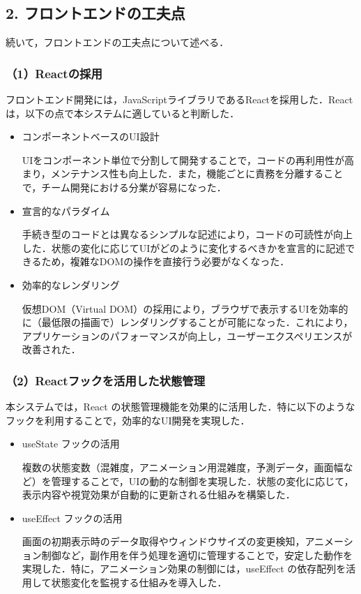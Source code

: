 \subsection*{2. フロントエンドの工夫点}

続いて，フロントエンドの工夫点について述べる．

\subsubsection*{（1）Reactの採用}
フロントエンド開発には，JavaScriptライブラリであるReactを採用した．Reactは，以下の点で本システムに適していると判断した．

\begin{itemize}
	\item コンポーネントベースのUI設計
	
	UIをコンポーネント単位で分割して開発することで，コードの再利用性が高まり，メンテナンス性も向上した．また，機能ごとに責務を分離することで，チーム開発における分業が容易になった．
	
	\item 宣言的なパラダイム
	
	手続き型のコードとは異なるシンプルな記述により，コードの可読性が向上した．状態の変化に応じてUIがどのように変化するべきかを宣言的に記述できるため，複雑なDOMの操作を直接行う必要がなくなった．
	
	\item 効率的なレンダリング
	
	仮想DOM（Virtual DOM）の採用により，ブラウザで表示するUIを効率的に（最低限の描画で）レンダリングすることが可能になった．これにより，アプリケーションのパフォーマンスが向上し，ユーザーエクスペリエンスが改善された．
\end{itemize}

\subsubsection*{（2）Reactフックを活用した状態管理}
本システムでは，React の状態管理機能を効果的に活用した．特に以下のようなフックを利用することで，効率的なUI開発を実現した．

\begin{itemize}
	\item useState フックの活用
	
	複数の状態変数（混雑度，アニメーション用混雑度，予測データ，画面幅など）を管理することで，UIの動的な制御を実現した．状態の変化に応じて，表示内容や視覚効果が自動的に更新される仕組みを構築した．
	
	\item useEffect フックの活用
	
	画面の初期表示時のデータ取得やウィンドウサイズの変更検知，アニメーション制御など，副作用を伴う処理を適切に管理することで，安定した動作を実現した．特に，アニメーション効果の制御には，useEffect の依存配列を活用して状態変化を監視する仕組みを導入した．
\end{itemize}

